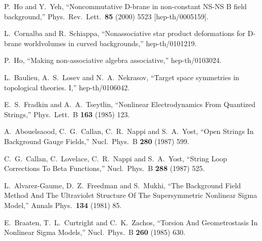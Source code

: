 \documentclass[a4paper,12pt]{article}
\begin{document}
P.~Ho and Y.~Yeh,
``Noncommutative D-brane in non-constant NS-NS B field background,''
Phys.\ Rev.\ Lett.\  {\bf 85} (2000) 5523
[hep-th/0005159].

L.~Cornalba and R.~Schiappa,
``Nonassociative star product deformations for D-brane worldvolumes in
curved backgrounds,''
hep-th/0101219.

P.~Ho,
``Making non-associative algebra associative,''
hep-th/0103024.

L.~Baulieu, A.~S.~Losev and N.~A.~Nekrasov,
``Target space symmetries in topological theories. I,''
hep-th/0106042.



E.~S.~Fradkin and A.~A.~Tseytlin,
``Nonlinear Electrodynamics From Quantized Strings,''
Phys.\ Lett.\ B {\bf 163} (1985) 123.

A.~Abouelsaood, C.~G.~Callan, C.~R.~Nappi and S.~A.~Yost,
``Open Strings In Background Gauge Fields,''
Nucl.\ Phys.\ B {\bf 280} (1987) 599.

C.~G.~Callan, C.~Lovelace, C.~R.~Nappi and S.~A.~Yost,
``String Loop Corrections To Beta Functions,''
Nucl.\ Phys.\ B {\bf 288} (1987) 525.

L.~Alvarez-Gaume, D.~Z.~Freedman and S.~Mukhi,
``The Background Field Method And The Ultraviolet Structure Of 
The Supersymmetric Nonlinear Sigma Model,''
Annals Phys.\  {\bf 134} (1981) 85.

E.~Braaten, T.~L.~Curtright and C.~K.~Zachos,
``Torsion And Geometrostasis In Nonlinear Sigma Models,''
Nucl.\ Phys.\ B {\bf 260} (1985) 630.
\end{document}
